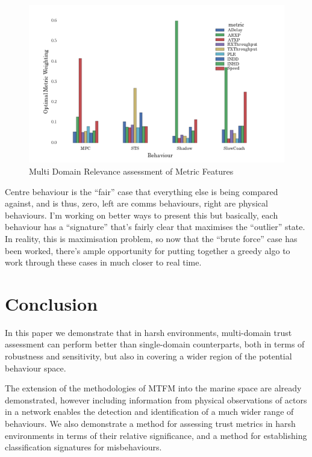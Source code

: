 \documentclass{aamas2016}
\begin{document}
\begin{figure}[h]
  \centering
  \includegraphics[width=\linewidth]{full_metric_trust_relevance}
  \caption{Multi Domain Relevance assessment of Metric Features}
  \label{fig:multi_trust_relevance}
\end{figure}


Centre behaviour is the ``fair'' case that everything else is being compared against, and is thus, zero, left are comms behaviours, right are physical behaviours. I'm working on better ways to present this but basically, each behaviour has a ``signature'' that’s fairly clear that maximises the ``outlier'' state. In reality, this is maximisation problem, so now that the ``brute force'' case has been worked, there’s ample opportunity for putting together a greedy algo to work through these cases in much closer to real time.


\section{Conclusion}
In this paper we demonstrate that in harsh environments, multi-domain trust assessment can perform better than single-domain counterparts, both in terms of robustness and sensitivity, but also in covering a wider region of the potential behaviour space. 

The extension of the methodologies of MTFM into the marine space are already demonstrated, however including information from physical observations of actors in a network enables the detection and identification of a much wider range of behaviours.
We also demonstrate a method for assessing trust metrics in harsh environments in terms of their relative significance, and a method for establishing classification signatures for misbehaviours.
\end{document}
